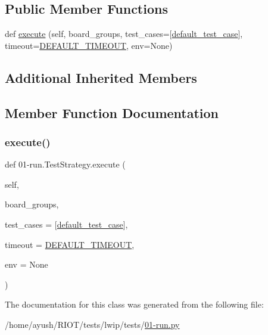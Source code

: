 \subsection*{Public Member Functions}
\begin{DoxyCompactItemize}
\item 
def \hyperlink{class01-run_1_1TestStrategy_a6e7d1c24bb5cee486ee0a45ccd294db7}{execute} (self, board\+\_\+groups, test\+\_\+cases=\mbox{[}\hyperlink{namespace01-run_ad8f8d1b62f5d6ce614a7956dc3a6ca40}{default\+\_\+test\+\_\+case}\mbox{]}, timeout=\hyperlink{namespace01-run_aef2372a86df3a2d4d21068f27005d720}{D\+E\+F\+A\+U\+L\+T\+\_\+\+T\+I\+M\+E\+O\+UT}, env=None)
\end{DoxyCompactItemize}
\subsection*{Additional Inherited Members}


\subsection{Member Function Documentation}
\mbox{\label{class01-run_1_1TestStrategy_a6e7d1c24bb5cee486ee0a45ccd294db7}} 
\subsubsection{\texorpdfstring{execute()}{execute()}}
{\footnotesize\ttfamily def 01-\/run.\+Test\+Strategy.\+execute (\begin{DoxyParamCaption}\item[{}]{self,  }\item[{}]{board\+\_\+groups,  }\item[{}]{test\+\_\+cases = {\ttfamily \mbox{[}\hyperlink{namespace01-run_ad8f8d1b62f5d6ce614a7956dc3a6ca40}{default\+\_\+test\+\_\+case}\mbox{]}},  }\item[{}]{timeout = {\ttfamily \hyperlink{namespace01-run_aef2372a86df3a2d4d21068f27005d720}{D\+E\+F\+A\+U\+L\+T\+\_\+\+T\+I\+M\+E\+O\+UT}},  }\item[{}]{env = {\ttfamily None} }\end{DoxyParamCaption})}



The documentation for this class was generated from the following file\+:\begin{DoxyCompactItemize}
\item 
/home/ayush/\+R\+I\+O\+T/tests/lwip/tests/\hyperlink{lwip_2tests_201-run_8py}{01-\/run.\+py}\end{DoxyCompactItemize}
